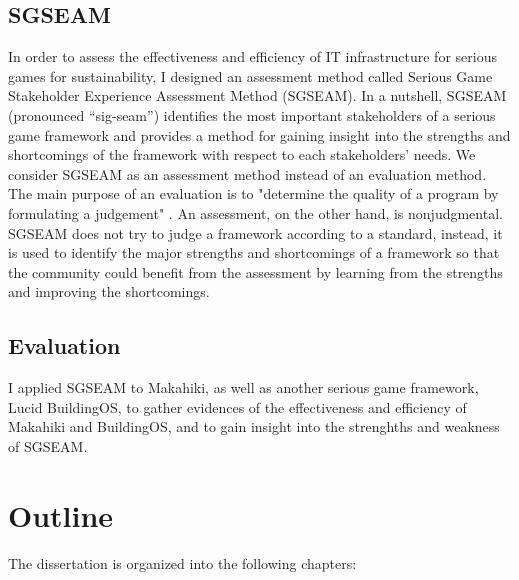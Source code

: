 \subsection{SGSEAM}
In order to assess the effectiveness and efficiency of IT infrastructure for serious games for 
sustainability, I designed an assessment method called Serious Game Stakeholder Experience Assessment Method (SGSEAM). In a nutshell, SGSEAM (pronounced ``sig-seam'') identifies the most important stakeholders of a
serious game framework and provides a method for gaining insight into the strengths
and shortcomings of the framework with respect to each stakeholders' needs. We consider
SGSEAM as an assessment method instead of an evaluation method. The main purpose of an
evaluation is to "determine the quality of a program by formulating a judgement"
\cite{hurteau2009legitimate}. An assessment, on the other hand, is nonjudgmental. SGSEAM does
not try to judge a framework according to a standard, instead, it is used to identify the major
strengths and shortcomings of a framework so that the community could benefit from the
assessment by learning from the strengths and improving the shortcomings.

\subsection{Evaluation}
I applied SGSEAM to Makahiki, as well as another serious game framework, Lucid BuildingOS\cite{building-dashboard}, to gather evidences of the effectiveness and efficiency of Makahiki and BuildingOS, and to gain insight into the strenghths and weakness of SGSEAM.

\section{Outline}

The dissertation is organized into the following chapters:


